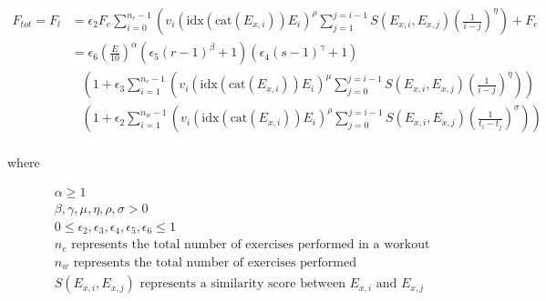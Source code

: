 \begin{minipage}{\textwidth}
	\begin{equation}
		\label{eq:P2C1_LatentFatigue}
		\begin{split}
			F_{tot} = F_l & = 
			\epsilon_2 F_e 
			\sum_{i=0}^{n_e-1} \left( 
				v_i \left(
					\text{idx}(\text{cat}(E_{x,i})) E_i
				\right)^\rho
				\sum_{j=1}^{j=i-1} S(E_{x,i},E_{x,j})\left(
					\frac{1}{i-j}
				\right)^\eta
			\right)
			+ F_e
			\\
			& = \epsilon_6 \left( \frac{E}{10} \right)^\alpha
				\left( \epsilon_5 (r-1)^\beta + 1 \right)
				\left(\epsilon_4 (s-1)^\gamma+1  \right)
				\\
				& \;\;\;
				\left(
					1+\epsilon_3 \sum_{i=1}^{n_e-1} \left( 
						v_i \left(
							\text{idx}(\text{cat}(E_{x,i})) E_i
						\right)^\mu
						\sum_{j=0}^{j=i-1} S(E_{x,i},E_{x,j})\left(
							\frac{1}{i-j}
						\right)^\eta
					\right)
				\right)
				\\
				& \;\;\;
				\left(
					1+\epsilon_2 \sum_{i=1}^{n_w-1} \left( 
						v_i \left(
							\text{idx}(\text{cat}(E_{x,i})) E_i
						\right)^\rho
						\sum_{j=0}^{j=i-1} S(E_{x,i},E_{x,j})\left(
							\frac{1}{t_i-t_j}
						\right)^\sigma
					\right)
				\right)
			\\
		\end{split}
	\end{equation}
	\centerline{where}
	\begin{equation*}
		\begin{split}
		    & \alpha \ge 1 \\
		    & \beta,\gamma, \mu, \eta, \rho, \sigma > 0 \\
			& 0 \le \epsilon_2, \epsilon_3, \epsilon_4, \epsilon_5, \epsilon_6 \le 1 \\
			& n_e \text{ represents the total number of exercises performed in a workout} \\
			& n_w \text{ represents the total number of exercises performed} \\
			& S(E_{x,i},E_{x,j}) \text{ represents a similarity score between } E_{x,i} \text{ and } E_{x,j} \\
		\end{split}
	\end{equation*}
\end{minipage}\\

